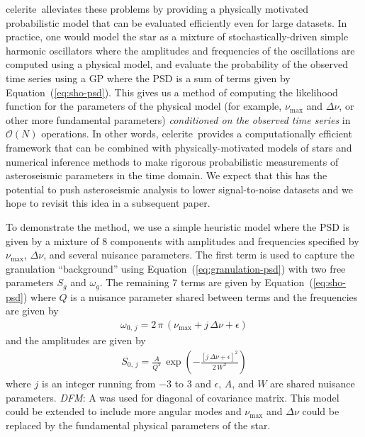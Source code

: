 \documentclass[manuscript, letterpaper]{aastex6}
\newcommand{\project}[1]{\textsf{#1}}
\newcommand{\celerite}{\project{celerite}}
\renewcommand{\eqref}[1]{\ref{eq:#1}}
\newcommand{\Eq}[1]{Equation~(\eqref{#1})}
\newcommand{\eq}[1]{\Eq{#1}}
\newcommand{\todo}[3]{{\color{#2}\emph{#1}: #3}}
\newcommand{\dfmtodo}[1]{\todo{DFM}{red}{#1}}
\begin{document}
\celerite\ alleviates these problems by providing a physically motivated
probabilistic model that can be evaluated efficiently even for large datasets.
In practice, one would model the star as a mixture of stochastically-driven
simple harmonic oscillators where the amplitudes and frequencies of the
oscillations are computed using a physical model, and evaluate the probability
of the observed time series using a GP where the PSD is a sum of terms given
by \eq{sho-psd}.
This gives us a method of computing the likelihood function for the parameters
of the physical model (for example, $\nu_\mathrm{max}$ and $\Delta \nu$, or
other more fundamental parameters) \emph{conditioned on the observed time
series} in $\mathcal{O}(N)$ operations.
In other words, \celerite\ provides a computationally efficient framework that
can be combined with physically-motivated models of stars and numerical
inference methods to make rigorous probabilistic measurements of asteroseismic
parameters in the time domain.
We expect that this has the potential to push asteroseismic analysis to lower
signal-to-noise datasets and we hope to revisit this idea in a subsequent
paper.

To demonstrate the method, we use a simple heuristic model where the PSD is
given by a mixture of 8 components with amplitudes and frequencies specified
by $\nu_\mathrm{max}$, $\Delta \nu$, and several nuisance parameters.
The first term is used to capture the granulation ``background''
\citep{Kallinger:2014} using \eq{granulation-psd} with two free parameters
$S_g$ and $\omega_g$.
The remaining  7 terms are given by \eq{sho-psd} where $Q$ is a nuisance
parameter shared between terms and the frequencies are given by
\begin{eqnarray}
\omega_{0,\,j} = 2\,\pi\,(\nu_\mathrm{max} + j\,\Delta\nu + \epsilon)
\end{eqnarray}
and the amplitudes are given by
\begin{eqnarray}
S_{0,\,j} =
    \frac{A}{Q^2}\,\exp\left(-\frac{[j\,\Delta\nu + \epsilon]^2}{2\,W^2}\right)
\end{eqnarray}
where $j$ is an integer running from $-3$ to 3 and $\epsilon$, $A$, and $W$
are shared nuisance parameters. \dfmtodo{A was used for diagonal of
covariance matrix.}
This model could be extended to include more angular modes and
$\nu_\mathrm{max}$ and $\Delta \nu$ could be replaced by the fundamental
physical parameters of the star.
\end{document}
